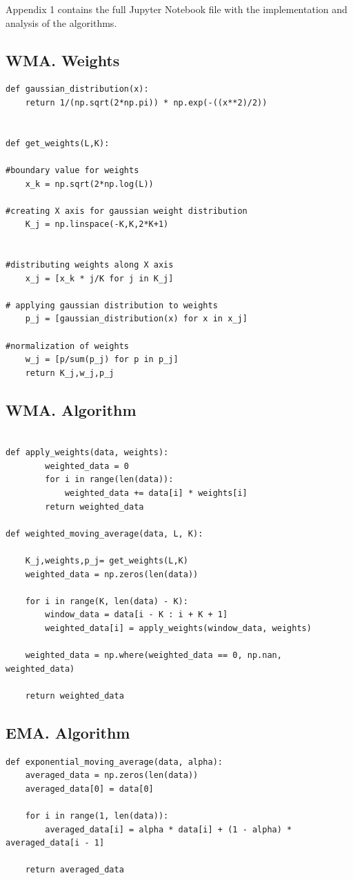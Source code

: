 \documentclass[a4paper,12pt,fleqn]{article}
\begin{document}
Appendix 1 contains the full Jupyter Notebook file with the implementation and analysis of the algorithms. 

        \subsection{WMA. Weights}
        \begin{verbatim}
def gaussian_distribution(x):
    return 1/(np.sqrt(2*np.pi)) * np.exp(-((x**2)/2))      
    
    
def get_weights(L,K):

#boundary value for weights
    x_k = np.sqrt(2*np.log(L))

#creating X axis for gaussian weight distribution
    K_j = np.linspace(-K,K,2*K+1)


#distributing weights along X axis
    x_j = [x_k * j/K for j in K_j]

# applying gaussian distribution to weights
    p_j = [gaussian_distribution(x) for x in x_j]

#normalization of weights
    w_j = [p/sum(p_j) for p in p_j]
    return K_j,w_j,p_j
        \end{verbatim}
\newpage
        \subsection{WMA. Algorithm}
        \begin{verbatim}

def apply_weights(data, weights):
        weighted_data = 0
        for i in range(len(data)):
            weighted_data += data[i] * weights[i]
        return weighted_data

def weighted_moving_average(data, L, K):
    
    K_j,weights,p_j= get_weights(L,K)
    weighted_data = np.zeros(len(data))
    
    for i in range(K, len(data) - K):
        window_data = data[i - K : i + K + 1]
        weighted_data[i] = apply_weights(window_data, weights)
    
    weighted_data = np.where(weighted_data == 0, np.nan, weighted_data)
    
    return weighted_data
            \end{verbatim}
        \subsection{EMA. Algorithm}
        \begin{verbatim}
def exponential_moving_average(data, alpha):
    averaged_data = np.zeros(len(data))
    averaged_data[0] = data[0]
    
    for i in range(1, len(data)):
        averaged_data[i] = alpha * data[i] + (1 - alpha) * averaged_data[i - 1]
        
    return averaged_data
            \end{verbatim}
\end{document}
